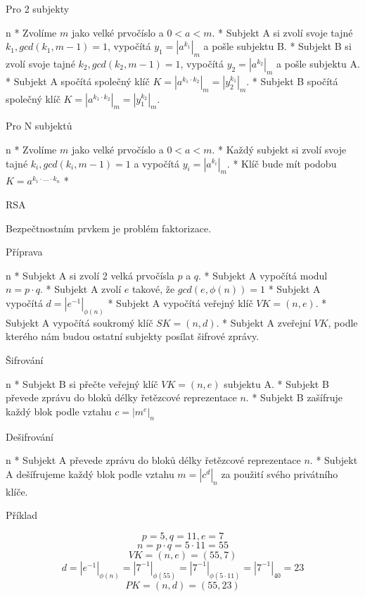 \secc Pro 2 subjekty

\begitems \style n
* Zvolíme $m$ jako velké prvočíslo a $0 < a < m$.
* Subjekt A si zvolí svoje tajné $k_1, gcd(k_1, m - 1) = 1$, vypočítá $y_1 = \left| a^{k_1} \right|_m$ a pošle subjektu B.
* Subjekt B si zvolí svoje tajné $k_2, gcd(k_2, m - 1) = 1$, vypočítá $y_2 = \left| a^{k_2} \right|_m$ a pošle subjektu A.
* Subjekt A spočítá společný klíč $K = \left|a^{k_1 \cdot k_2}\right|_m = \left|y_{2}^{k_1}\right|_m$.
* Subjekt B spočítá společný klíč $K = \left|a^{k_1 \cdot k_2}\right|_m = \left|y_{1}^{k_2}\right|_m$.
\enditems

\secc Pro N subjektů

\begitems \style n
* Zvolíme $m$ jako velké prvočíslo a $0 < a < m$.
* Každý subjekt si zvolí svoje tajné $k_i, gcd(k_i, m - 1) = 1$ a vypočítá $y_i = \left| a^{k_i} \right|_m$.
* Klíč bude mít podobu $K = a^{k_1 \cdot \ldots \cdot k_n}$
* 
\enditems

\sec RSA

Bezpečtnostním prvkem je problém faktorizace.

\secc Příprava

\begitems \style n
* Subjekt A si zvolí 2 velká prvočísla $p$ a $q$.
* Subjekt A vypočítá modul $n = p \cdot q$.
* Subjekt A zvolí $e$ takové, že $gcd\left(e, \phi\left(n\right)\right) = 1$
* Subjekt A vypočítá $d = \left|e^{-1}\right|_{\phi\left(n\right)}$
* Subjekt A vypočítá veřejný klíč $VK = \left(n, e\right)$.
* Subjekt A vypočítá soukromý klíč $SK = \left(n, d\right)$.
* Subjekt A zveřejní $VK$, podle kterého nám budou ostatní subjekty posílat šifrové zprávy.
\enditems

\secc Šifrování

\begitems \style n
* Subjekt B si přečte veřejný klíč $VK = \left(n, e\right)$ subjektu A.
* Subjekt B převede zprávu do bloků délky řetězcové reprezentace $n$.
* Subjekt B zašífruje každý blok podle vztahu $c = \left|m^e\right|_n$
\enditems

\secc Dešifrování

\begitems \style n
* Subjekt A převede zprávu do bloků délky řetězcové reprezentace $n$.
* Subjekt A dešífrujeme každý blok podle vztahu $m = \left|c^d\right|_n$ za použití svého privátního klíče.
\enditems

\secc Příklad

$$p = 5, q = 11, e = 7$$
$$n = p \cdot q = 5 \cdot 11 = 55$$
$$VK = (n, e) = (55, 7)$$
$$d = \left|e^{-1}\right|_{\phi(n)} = \left|7^{-1}\right|_{\phi(55)} = \left|7^{-1}\right|_{\phi(5 \cdot 11)} = \left|7^{-1}\right|_{40} = 23$$
$$PK = (n, d) = (55, 23)$$

